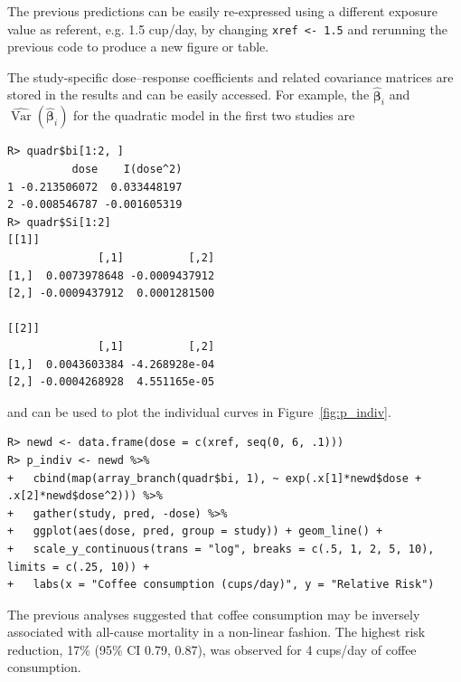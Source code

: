\documentclass[11pt,a4paper,twoside,openany]{book}\usepackage{knitr}
\DeclareMathOperator{\Var}{Var}
\begin{document}
{{\noindent The previous predictions can be easily re-expressed using a different exposure value as referent, e.g. 1.5 cup/day, by changing \texttt{xref <- 1.5} and rerunning the previous code to produce a new figure or table.

The study-specific dose--response coefficients and related covariance matrices are stored in the results and can be easily accessed. For example, the $\boldsymbol{\hat \beta}_i$ and $\widehat{\Var} \left( \boldsymbol{\hat \beta}_i \right)$ for the quadratic model in the first two studies are

\begin{knitrout}\footnotesize
{}\color{fgcolor}\begin{kframe}
\begin{verbatim}
R> quadr$bi[1:2, ]
          dose    I(dose^2)
1 -0.213506072  0.033448197
2 -0.008546787 -0.001605319
R> quadr$Si[1:2]
[[1]]
              [,1]          [,2]
[1,]  0.0073978648 -0.0009437912
[2,] -0.0009437912  0.0001281500

[[2]]
              [,1]          [,2]
[1,]  0.0043603384 -4.268928e-04
[2,] -0.0004268928  4.551165e-05
\end{verbatim}
\end{kframe}
\end{knitrout}

\noindent and can be used to plot the individual curves in Figure~\ref{fig:p_indiv}.
\begin{knitrout}\footnotesize
{}\color{fgcolor}\begin{kframe}
\begin{verbatim}
R> newd <- data.frame(dose = c(xref, seq(0, 6, .1)))
R> p_indiv <- newd %>%
+   cbind(map(array_branch(quadr$bi, 1), ~ exp(.x[1]*newd$dose + .x[2]*newd$dose^2))) %>%
+   gather(study, pred, -dose) %>%
+   ggplot(aes(dose, pred, group = study)) + geom_line() +
+   scale_y_continuous(trans = "log", breaks = c(.5, 1, 2, 5, 10), limits = c(.25, 10)) +
+   labs(x = "Coffee consumption (cups/day)", y = "Relative Risk")
\end{verbatim}
\end{kframe}
\end{knitrout}

\noindent The previous analyses suggested that coffee consumption may be inversely associated with all-cause mortality in a non-linear fashion. The highest risk reduction, 17\% (95\% CI 0.79, 0.87), was observed for 4 cups/day of coffee consumption.


}}
\end{document}
